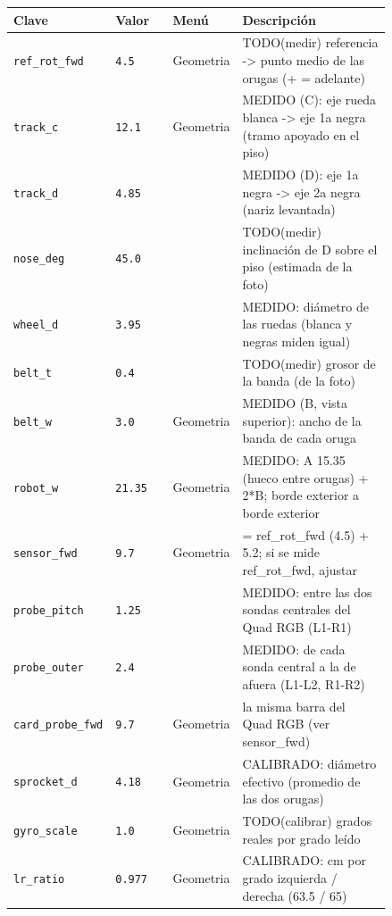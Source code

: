 \begin{longtable}{@{}p{0.2\linewidth}p{0.17\linewidth}lp{0.47\linewidth}@{}}\toprule
\textbf{Clave} & \textbf{Valor} & \textbf{Men\'u} & \textbf{Descripci\'on} \\\midrule\endhead
\texttt{ref\_\allowbreak{}rot\_\allowbreak{}fwd} & \texttt{4.5} & Geometria & TODO(medir) referencia -> punto medio de las orugas (+ = adelante) \\
\texttt{track\_\allowbreak{}c} & \texttt{12.1} & Geometria & MEDIDO (C): eje rueda blanca -> eje 1a negra (tramo apoyado en el piso) \\
\texttt{track\_\allowbreak{}d} & \texttt{4.85} &  & MEDIDO (D): eje 1a negra -> eje 2a negra (nariz levantada) \\
\texttt{nose\_\allowbreak{}deg} & \texttt{45.0} &  & TODO(medir) inclinación de D sobre el piso (estimada de la foto) \\
\texttt{wheel\_\allowbreak{}d} & \texttt{3.95} &  & MEDIDO: diámetro de las ruedas (blanca y negras miden igual) \\
\texttt{belt\_\allowbreak{}t} & \texttt{0.4} &  & TODO(medir) grosor de la banda (de la foto) \\
\texttt{belt\_\allowbreak{}w} & \texttt{3.0} & Geometria & MEDIDO (B, vista superior): ancho de la banda de cada oruga \\
\texttt{robot\_\allowbreak{}w} & \texttt{21.35} & Geometria & MEDIDO: A 15.35 (hueco entre orugas) + 2*B; borde exterior a borde exterior \\
\texttt{sensor\_\allowbreak{}fwd} & \texttt{9.7} & Geometria & = ref\_rot\_fwd (4.5) + 5.2; si se mide ref\_rot\_fwd, ajustar \\
\texttt{probe\_\allowbreak{}pitch} & \texttt{1.25} &  & MEDIDO: entre las dos sondas centrales del Quad RGB (L1-R1) \\
\texttt{probe\_\allowbreak{}outer} & \texttt{2.4} &  & MEDIDO: de cada sonda central a la de afuera (L1-L2, R1-R2) \\
\texttt{card\_\allowbreak{}probe\_\allowbreak{}fwd} & \texttt{9.7} & Geometria & la misma barra del Quad RGB (ver sensor\_fwd) \\
\texttt{sprocket\_\allowbreak{}d} & \texttt{4.18} & Geometria & CALIBRADO: diámetro efectivo (promedio de las dos orugas) \\
\texttt{gyro\_\allowbreak{}scale} & \texttt{1.0} & Geometria & TODO(calibrar) grados reales por grado leído \\
\texttt{lr\_\allowbreak{}ratio} & \texttt{0.977} & Geometria & CALIBRADO: cm por grado izquierda / derecha (63.5 / 65) \\

\end{longtable}
